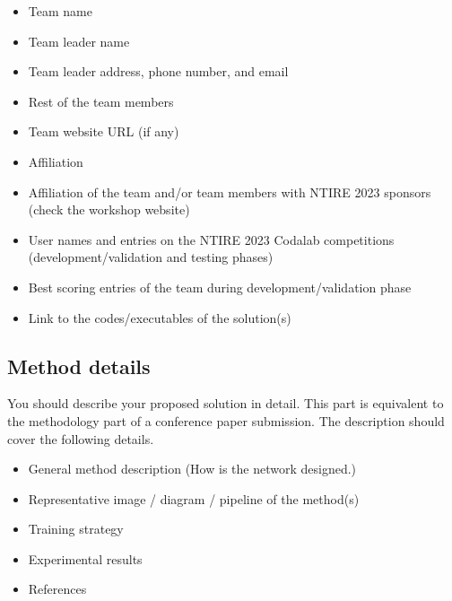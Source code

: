 \documentclass[10pt,twocolumn,letterpaper]{article}
\begin{document}
\begin{itemize}
\item Team name                                  
\item Team leader name                           
\item Team leader address, phone number, and email 
\item Rest of the team members        
\item Team website URL (if any)                   
\item Affiliation
\item Affiliation of the team and/or team members with NTIRE 2023 sponsors (check the workshop website)
\item User names and entries on the NTIRE 2023 Codalab competitions (development/validation and testing phases)
\item Best scoring entries of the team during development/validation phase
\item Link to the codes/executables of the solution(s)
\end{itemize}

\subsection{Method details}

You should describe your proposed solution in detail. This part is equivalent to the methodology part of a conference paper submission. The description should cover the following details.

\begin{itemize}
\item General method description (How is the network designed.)                                
\item Representative image / diagram / pipeline of the method(s)  
\item Training strategy
\item Experimental results
\item References                                               
\end{itemize}
\end{document}
